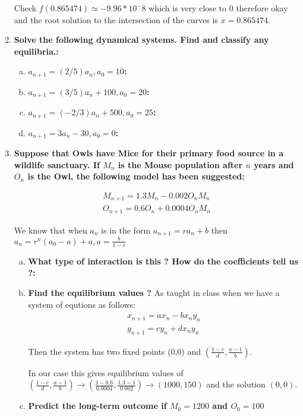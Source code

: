 \documentclass{article}
\begin{document}
\begin{enumerate}[1.]
Check $f(0.865474) \simeq -9.96 * 10^-8$ which is very close to 0 therefore okay and the root solution to the intersection of the curves is $x = 0.865474$.

\item
\textbf{Solve the following dynamical systems. Find and classify any equilibria.:}
\begin{enumerate}[(a)]
  \item \textbf{$a_{n+1} = (2/5)a_n, a_0 = 10$:} 
  \item \textbf{$a_{n+1} = (3/5)a_n + 100, a_0 = 20$:} 
  \item \textbf{$a_{n+1} = (-2/3)a_n + 500, a_0 = 25$:}
  \item \textbf{$a_{n+1} = 3a_n - 30, a_0 = 0$:}
\end{enumerate}

\item 
\textbf{Suppose that Owls have Mice for their primary food source in a wildlife sanctuary. If $M_n$ is the Mouse population after $n$ years and $O_n$ is the Owl, the following model has been suggested:}

\begin{gather*}
M_{n+1} = 1.3M_n - 0.002O_nM_n \\
O_{n+1} = 0.6O_n + 0.0004O_nM_n
\end{gather*}

We know that when $a_n$ is in the form $a_{n+1} = ra_n + b$ then $a_n = r^n(a_0 - a) + a, a = \frac{b}{1-r}$

\begin{enumerate}[(a)]
\item
\textbf{What type of interaction is this ? How do the coefficients tell us ?:}
\item
\textbf{Find the equilibrium values ?}
As taught in class when we have a system of equtions as follows:
\begin{gather*}
x_{n+1} = ax_n-bx_ny_n \\
y_{n+1} = cy_n + dx_ny_n
\end{gather*}

Then the system has two fixed points (0,0) and $(\frac{1-c}{d},\frac{a-1}{b})$. 

In our case this gives equilibrium values of $(\frac{1-c}{d},\frac{a-1}{b}) \to (\frac{1 - 0.6}{0.0004}, \frac{1.3 - 1}{0.002}) \to (1000, 150)$ and the solution $(0,0)$. 
\item
\textbf{Predict the long-term outcome if $M_0 = 1200$ and $O_0 = 100$}
\end{enumerate}

\end{enumerate}
\end{document}
